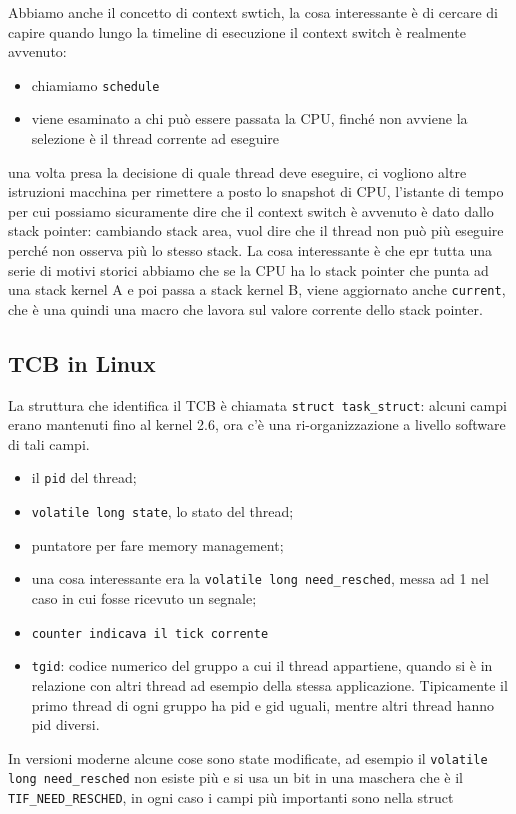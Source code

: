 \documentclass[12pt, oneside]{extbook}
\begin{document}
Abbiamo anche il concetto di context swtich, la cosa interessante è di cercare di capire quando lungo la timeline di esecuzione il context switch è realmente avvenuto:
\begin{itemize}
\item chiamiamo \texttt{schedule}
\item viene esaminato a chi può essere passata la CPU, finché non avviene la selezione è il thread corrente ad eseguire
\end{itemize}
una volta presa la decisione di quale thread deve eseguire, ci vogliono altre istruzioni macchina per rimettere a posto lo snapshot di CPU, l'istante di tempo per cui possiamo sicuramente dire che il context switch è avvenuto è dato dallo stack pointer: cambiando stack area, vuol dire che il thread non può più eseguire perché non osserva più lo stesso stack. La cosa interessante è che epr tutta una serie di motivi storici abbiamo che se la CPU ha lo stack pointer che punta ad una stack kernel A e poi passa a stack kernel B, viene aggiornato anche \texttt{current}, che è una quindi una macro che lavora sul valore corrente dello stack pointer.
\subsection{TCB in Linux}
La struttura che identifica il TCB è chiamata \texttt{struct task\_struct}: alcuni campi erano mantenuti fino al kernel 2.6, ora c'è una ri-organizzazione a livello software di tali campi.
\begin{itemize}
\item il \texttt{pid} del thread;
\item \texttt{volatile long state}, lo stato del thread;
\item puntatore per fare memory management;
\item una cosa interessante era la \texttt{volatile long need\_resched}, messa ad 1 nel caso in cui fosse ricevuto un segnale;
\item \texttt{counter indicava il tick corrente} 
\item \texttt{tgid}: codice numerico del gruppo a cui il thread appartiene, quando si è in relazione con altri thread ad esempio della stessa applicazione. Tipicamente il primo thread di ogni gruppo ha pid e gid uguali, mentre altri thread hanno pid diversi.
\end{itemize}
In versioni moderne alcune cose sono state modificate, ad esempio il \texttt{volatile long need\_resched} non esiste più e si usa un bit in una maschera che è il  \texttt{TIF\_NEED\_RESCHED}, in ogni caso i campi più importanti sono nella struct
\end{document}
